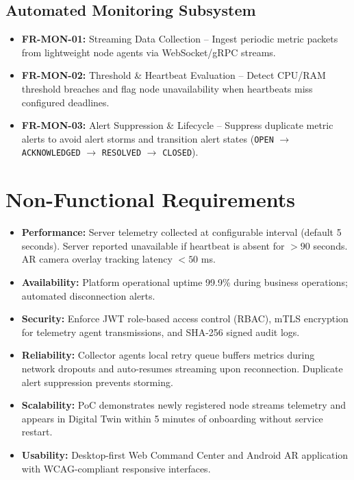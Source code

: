 \subsection{Automated Monitoring Subsystem}
\begin{itemize}
    \item \textbf{FR-MON-01:} Streaming Data Collection -- Ingest periodic metric packets from lightweight node agents via WebSocket/gRPC streams.
    \item \textbf{FR-MON-02:} Threshold \& Heartbeat Evaluation -- Detect CPU/RAM threshold breaches and flag node unavailability when heartbeats miss configured deadlines.
    \item \textbf{FR-MON-03:} Alert Suppression \& Lifecycle -- Suppress duplicate metric alerts to avoid alert storms and transition alert states (\texttt{OPEN} $\rightarrow$ \texttt{ACKNOWLEDGED} $\rightarrow$ \texttt{RESOLVED} $\rightarrow$ \texttt{CLOSED}).
\end{itemize}

\section{Non-Functional Requirements}
\begin{itemize}
    \item \textbf{Performance:} Server telemetry collected at configurable interval (default 5 seconds). Server reported unavailable if heartbeat is absent for $>90$ seconds. AR camera overlay tracking latency $<50$ ms.
    \item \textbf{Availability:} Platform operational uptime 99.9\% during business operations; automated disconnection alerts.
    \item \textbf{Security:} Enforce JWT role-based access control (RBAC), mTLS encryption for telemetry agent transmissions, and SHA-256 signed audit logs.
    \item \textbf{Reliability:} Collector agents local retry queue buffers metrics during network dropouts and auto-resumes streaming upon reconnection. Duplicate alert suppression prevents storming.
    \item \textbf{Scalability:} PoC demonstrates newly registered node streams telemetry and appears in Digital Twin within 5 minutes of onboarding without service restart.
    \item \textbf{Usability:} Desktop-first Web Command Center and Android AR application with WCAG-compliant responsive interfaces.
\end{itemize}

